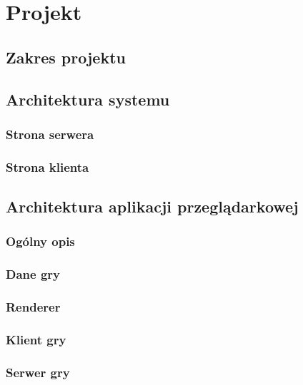 \chapter{Projekt}
\label{cha:projekt}

\section{Zakres projektu}
\label{sec:zakresProjektu}

\section{Architektura systemu}
\label{sec:architekturaSystemu}

\subsection{Strona serwera}
\label{ssec:stronaSerwera}

\subsection{Strona klienta}
\label{ssec:stronaKlienta}

\section{Architektura aplikacji przeglądarkowej}
\label{ssec:architekturaAplikacji}

\subsection{Ogólny opis}
\label{ssec:ogolnyOpis}

\subsection{Dane gry}
\label{ssec:daneGry}

\subsection{Renderer}
\label{ssec:renderer}

\subsection{Klient gry}
\label{ssec:klientGry}

\subsection{Serwer gry}
\label{ssec:serwerGry}






